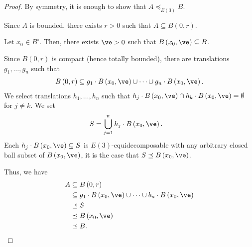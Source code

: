 \begin{proof}
  By symmetry, it is enough to show that $A\preceq_{E(3)} B$.\newline

  Since $A$ is bounded, there exists $r > 0$ such that $A\subseteq B(0,r)$.\newline

  Let $x_0\in B^{\circ}$. Then, there exists $\ve > 0$ such that $B\left(x_0,\ve\right) \subseteq B$.\newline

  Since $B(0,r)$ is compact (hence totally bounded), there are translations $g_1,\dots,g_n$ such that
  \begin{align*}
    B\left(0,r\right) \subseteq g_1\cdot B\left(x_0,\ve\right) \cup \cdots \cup g_n\cdot B\left(x_0,\ve\right).
  \end{align*}
  We select translations $h_1,\dots,h_n$ such that $h_j\cdot B\left(x_0,\ve\right) \cap h_k\cdot B\left(x_0,\ve\right) = \emptyset$ for $j\neq k$. We set
  \begin{align*}
    S &= \bigcup_{j=1}^{n}h_j\cdot B\left(x_0,\ve\right).
  \end{align*}
  Each $h_j\cdot B\left(x_0,\ve\right)\subseteq S$ is $E(3)$-equidecomposable with any arbitrary closed ball subset of $B\left(x_0,\ve\right)$, it is the case that $S\preceq B\left(x_0,\ve\right)$.\newline

  Thus, we have
  \begin{align*}
    A &\subseteq B\left(0,r\right)\\
      &\subseteq g_1\cdot B\left(x_0,\ve\right)\cup\cdots\cup b_n\cdot B\left(x_0,\ve\right)\\
      &\preceq S\\
      &\preceq B\left(x_0,\ve\right)\\
      &\preceq B.
  \end{align*}
\end{proof}

